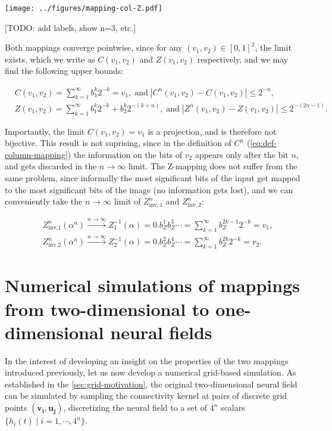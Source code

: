 \documentclass[10pt,letterpaper]{article}
\renewcommand{\vec}[1]{\boldsymbol{#1}}
\begin{document}
\texttt{[image: ../figures/mapping-col-Z.pdf]}

[TODO: add labels, show n=3, etc.]
\endif

Both mappings converge pointwise, since for any $(v_1,v_2) \in [0,1]^2$, the limit exists, which we write as $C(v_1,v_2)$ and $Z(v_1,v_2)$ respectively, and we may find the following upper bounds:

\begin{equation} \begin{aligned}
& C(v_1,v_2) = \sum_{k=1}^\infty b_1^k 2^{-k} = v_1, \;\text{and}\; |C^n(v_1,v_2)-C(v_1,v_2)| \leq 2^{-n},\\
& Z(v_1,v_2) = \sum_{k=1}^\infty b_1^k 2^{-k} + b_2^k 2^{-(k+n)}, \;\text{and}\; |Z^n(v_1,v_2)-Z(v_1,v_2)|\leq 2^{-(2n-1)}.
\end{aligned} \end{equation}

Importantly, the limit $C(v_1,v_2)=v_1$ is a projection, and is therefore not bijective. This result is not suprising, since in the definition of $C^n$ (\autoref{eq:def-column-mapping}) the information on the bits of $v_2$ appears only after the bit $n$, and gets discarded in the $n \to \infty$ limit. The Z-mapping does not suffer from the same problem, since informally the most significant bits of the input get mapped to the most significant bits of the image (no information gets lost), and we can conveniently take the $n \to \infty$ limit of $Z_{\textrm{inv},1}^n$ and $Z_{\textrm{inv},2}^n$:

\begin{equation} \begin{aligned}
&Z_{\textrm{inv,1}}^n(\alpha^n) \xrightarrow{n \to \infty} Z^{-1}_1(\alpha) = 0.b_Z^1 b_Z^3 \cdots = \sum_{k=1}^\infty b_Z^{2k-1} 2^{-k} = v_1,\\
&Z_{\textrm{inv,2}}^n(\alpha^n) \xrightarrow{n \to \infty} Z^{-1}_2(\alpha) = 0.b_Z^2 b_Z^4 \cdots = \sum_{k=1}^\infty b_Z^{2k} 2^{-k} = v_2.
\end{aligned} \end{equation}

\section{Numerical simulations of mappings from two-dimensional to one-dimensional neural fields}

In the interest of developing an insight on the properties of the two mappings introduced previously, let us now develop a numerical grid-based simulation.
As established in the \autoref{sec:grid-motivation}, the original two-dimensional neural field can be simulated by sampling the connectivity kernel at pairs of discrete grid points $(\vec{v_i},\vec{u_j})$, discretizing the neural field to a set of $4^n$ scalars $\{h_i(t) \;|\; i=1,\cdots,4^n\}$.
\end{document}
